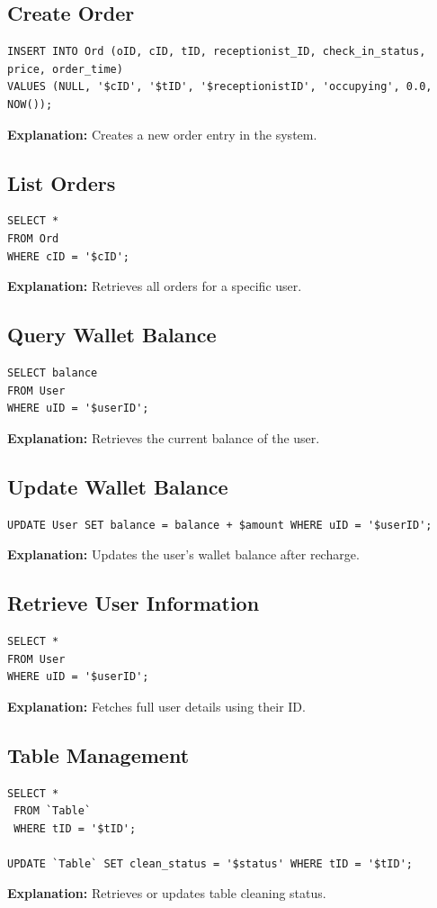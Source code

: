 \documentclass[12pt]{article}
\begin{document}
\subsection{Create Order}
\begin{lstlisting}
INSERT INTO Ord (oID, cID, tID, receptionist_ID, check_in_status, price, order_time)
VALUES (NULL, '$cID', '$tID', '$receptionistID', 'occupying', 0.0, NOW());
\end{lstlisting}
\textbf{Explanation:} Creates a new order entry in the system.

\subsection{List Orders}
\begin{lstlisting}
SELECT * 
FROM Ord 
WHERE cID = '$cID';
\end{lstlisting}
\textbf{Explanation:} Retrieves all orders for a specific user.

\subsection{Query Wallet Balance}
\begin{lstlisting}
SELECT balance 
FROM User 
WHERE uID = '$userID';
\end{lstlisting}
\textbf{Explanation:} Retrieves the current balance of the user.

\subsection{Update Wallet Balance}
\begin{lstlisting}
UPDATE User SET balance = balance + $amount WHERE uID = '$userID';
\end{lstlisting}
\textbf{Explanation:} Updates the user's wallet balance after recharge.

\subsection{Retrieve User Information}
\begin{lstlisting}
SELECT * 
FROM User 
WHERE uID = '$userID';
\end{lstlisting}
\textbf{Explanation:} Fetches full user details using their ID.

\subsection{Table Management}
\begin{lstlisting}
SELECT *
 FROM `Table` 
 WHERE tID = '$tID';

UPDATE `Table` SET clean_status = '$status' WHERE tID = '$tID';
\end{lstlisting}
\textbf{Explanation:} Retrieves or updates table cleaning status.
\end{document}
